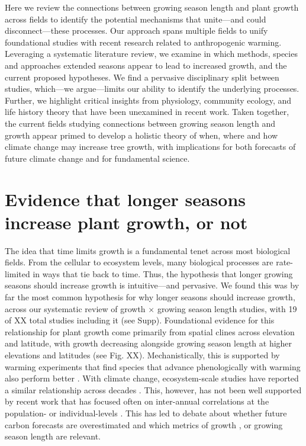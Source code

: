 \documentclass[11pt]{article}
\begin{document}
Here we review the connections between growing season length and plant growth across fields to identify the potential mechanisms that unite---and could disconnect---these processes. Our approach spans multiple fields to unify foundational studies with recent research related to anthropogenic warming. Leveraging a systematic literature review, we examine in which methods, species and approaches extended seasons appear to lead to increased growth, and the current proposed hypotheses. We find a pervasive disciplinary split between studies, which---we argue---limits our ability to identify the underlying processes. Further, we highlight critical insights from physiology, community ecology, and life history theory that have been unexamined in recent work. Taken together, the current fields studying connections between growing season length and growth appear primed to develop a holistic theory of when, where and how climate change may increase tree growth, with implications for both forecasts of future climate change and for fundamental science.
 
\section*{Evidence that longer seasons increase plant growth, or not}
The idea that time limits growth is a fundamental tenet across most biological fields. From the cellular to ecosystem levels, many biological processes are rate-limited in ways that tie back to time. Thus, the hypothesis that longer growing seasons should increase growth is intuitive---and pervasive. We found this was by far the most common hypothesis for why longer seasons should increase growth, across our systematic review of growth $\times$ growing season length studies, with 19 of XX total studies including it (see Supp). Foundational evidence for this relationship for plant growth come primarily from spatial clines across elevation and latitude, with growth decreasing alongside growing season length at higher elevations and latitudes (see Fig. XX). Mechanistically, this is supported by warming experiments that find species that advance phenologically with warming also perform better \citep[with performance most often measured by growth,][]{Cleland:2012}. With climate change, ecosystem-scale studies have reported a similar relationship across decades \citep{keenan2014net}. This, however, has not been well supported by recent work that has focused often on inter-annual correlations at the population- or individual-levels \citep{dow2022warm,silvestro2023longer}. This has led to debate about whether future carbon forecasts are overestimated and which metrics of growth \citep{green2022limits}, or growing season length \cite{korner2023four} are relevant.
\end{document}
